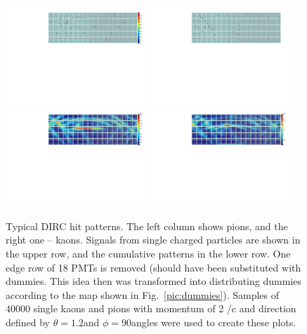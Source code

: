 \begin{figure}[!h]
\centering
\includegraphics[angle=0,width=0.47\textwidth]{pics/kaon2GeVa.pdf} \hspace{0.5cm} \includegraphics[angle=0,width=0.47\textwidth]{pics/pion2GeVa.pdf}\\
\includegraphics[angle=0,width=0.47\textwidth]{pics/kaons2GeV.pdf} \hspace{0.5cm} \includegraphics[angle=0,width=0.47\textwidth]{pics/pions2GeV.pdf}
\caption{\label{pic:hitpat1}
Typical \gluex DIRC hit patterns. The left column shows pions, and the right one -- kaons. 
Signals from single charged particles are shown in the upper row, and the cumulative patterns in the lower row.
One edge row of 18 PMTs is removed (should have been substituted with dummies. This idea then was transformed into distributing dummies according to the map shown in Fig.~\ref{pic:dummies}).
Samples of $40000$ single kaons and pions with momentum of 2 {\gev}/c and direction defined by $\theta = 1.2$\mydeg and $\phi = 90$\mydeg angles were used to create these plots.
}
\end{figure}

